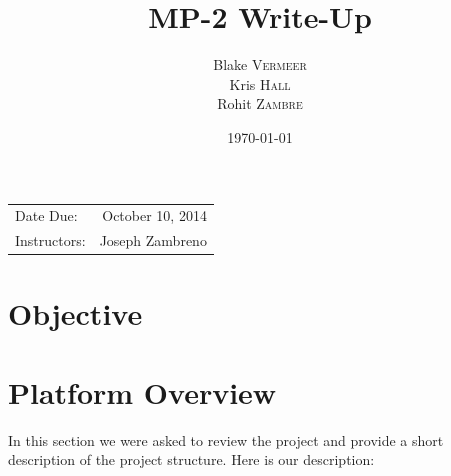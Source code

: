 \documentclass{article}
\title{MP-2 Write-Up} %
\author{Blake \textsc{Vermeer}\\
		Kris \textsc{Hall}\\
		Rohit \textsc{Zambre}} %
\date{\today} %
\begin{document}
\maketitle %

\begin{center}
\begin{tabular}{l r}
Date Due: & October 10, 2014 \\ %
Instructors: & Joseph Zambreno %
\end{tabular}
\end{center}







\section{Objective}



\section{Platform Overview}
In this section we were asked to review the project and provide a short description of the project structure. Here is our description: \\
\end{document}
